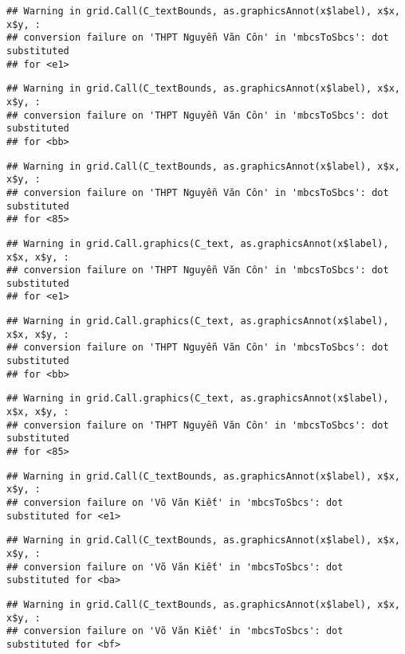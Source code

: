 \documentclass[
]{article}
\begin{document}
\begin{verbatim}
## Warning in grid.Call(C_textBounds, as.graphicsAnnot(x$label), x$x, x$y, :
## conversion failure on 'THPT Nguyễn Văn Côn' in 'mbcsToSbcs': dot substituted
## for <e1>
\end{verbatim}

\begin{verbatim}
## Warning in grid.Call(C_textBounds, as.graphicsAnnot(x$label), x$x, x$y, :
## conversion failure on 'THPT Nguyễn Văn Côn' in 'mbcsToSbcs': dot substituted
## for <bb>
\end{verbatim}

\begin{verbatim}
## Warning in grid.Call(C_textBounds, as.graphicsAnnot(x$label), x$x, x$y, :
## conversion failure on 'THPT Nguyễn Văn Côn' in 'mbcsToSbcs': dot substituted
## for <85>
\end{verbatim}

\begin{verbatim}
## Warning in grid.Call.graphics(C_text, as.graphicsAnnot(x$label), x$x, x$y, :
## conversion failure on 'THPT Nguyễn Văn Côn' in 'mbcsToSbcs': dot substituted
## for <e1>
\end{verbatim}

\begin{verbatim}
## Warning in grid.Call.graphics(C_text, as.graphicsAnnot(x$label), x$x, x$y, :
## conversion failure on 'THPT Nguyễn Văn Côn' in 'mbcsToSbcs': dot substituted
## for <bb>
\end{verbatim}

\begin{verbatim}
## Warning in grid.Call.graphics(C_text, as.graphicsAnnot(x$label), x$x, x$y, :
## conversion failure on 'THPT Nguyễn Văn Côn' in 'mbcsToSbcs': dot substituted
## for <85>
\end{verbatim}

\begin{verbatim}
## Warning in grid.Call(C_textBounds, as.graphicsAnnot(x$label), x$x, x$y, :
## conversion failure on 'Võ Văn Kiết' in 'mbcsToSbcs': dot substituted for <e1>
\end{verbatim}

\begin{verbatim}
## Warning in grid.Call(C_textBounds, as.graphicsAnnot(x$label), x$x, x$y, :
## conversion failure on 'Võ Văn Kiết' in 'mbcsToSbcs': dot substituted for <ba>
\end{verbatim}

\begin{verbatim}
## Warning in grid.Call(C_textBounds, as.graphicsAnnot(x$label), x$x, x$y, :
## conversion failure on 'Võ Văn Kiết' in 'mbcsToSbcs': dot substituted for <bf>
\end{verbatim}
\end{document}
